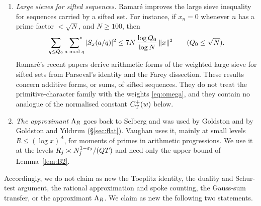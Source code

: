 \documentclass[11pt]{amsart}
\theoremstyle{definition}
\theoremstyle{remark}
\numberwithin{equation}{section}
\begin{document}
\begin{enumerate}[label=(\alph*),leftmargin=*]
\item \emph{Large sieves for sifted sequences.} Ramar\'e \cite[Thms.~5.2, 5.3]{Ram09} improves the large sieve inequality for sequences carried by a sifted set. For instance, if $x_n=0$ whenever $n$ has a prime factor $<\sqrt N$, and $N\ge100$, then
\[
\sum_{q\le Q_0}\ \sideset{}{^{*}}\sum_{a\bmod q}|S_x(a/q)|^2\le7N\,\frac{\log Q_0}{\log N}\,\|x\|^2\qquad(Q_0\le\sqrt N).
\]
Ramar\'e's recent papers \cite{Ram26,Ram26b} derive arithmetic forms of the weighted large sieve for sifted sets from Parseval's identity and the Farey dissection. These results concern additive forms, or sums, of sifted sequences. They do not treat the primitive-character family with the weights \eqref{eq:omega}, and they contain no analogue of the normalised constant $C^{+}_{\mathrm T}(w)$ below.
\item \emph{The approximant $\Lambda_{R}$} goes back to Selberg and was used by Goldston and by Goldston and Y{\i}ld{\i}r{\i}m (\S\ref{sec:flat}). Vaughan \cite{Vau03a} uses it, mainly at small levels $R\le(\log x)^A$, for moments of primes in arithmetic progressions. We use it at the levels $R_j\asymp N_j^{1-\varepsilon_3}/(QT)$ and need only the upper bound of Lemma~\ref{lem:B2}.
\end{enumerate}
Accordingly, we do not claim as new the Toeplitz identity, the duality and Schur-test argument, the rational approximation and spoke counting, the Gauss-sum transfer, or the approximant $\Lambda_{R}$. We claim as new the following two statements.
\end{document}
